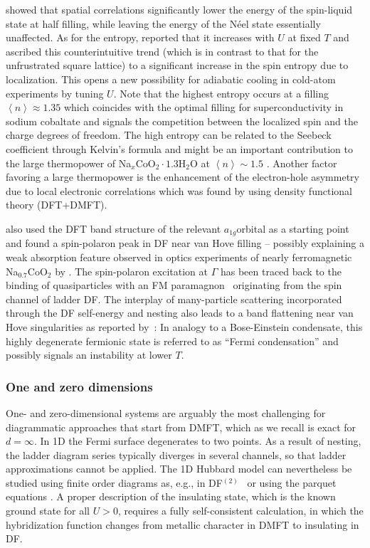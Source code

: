 \documentclass[rmp,aps,reprint,amsmath,amssymb,superscriptaddress,showpacs,nofootinbib]{revtex4-1}
\newcommand{\av}[1]{\ensuremath{\left\langle #1 \right\rangle}}
\begin{document}
 showed that spatial correlations significantly lower the energy of the spin-liquid state at half filling, while leaving the energy of the N\'eel state essentially unaffected. As for the entropy,  reported that  it increases with  $U$  at fixed $T$ and  ascribed this counterintuitive trend  (which is in contrast to that for the unfrustrated square lattice) to a significant increase in the spin entropy due to localization.  This opens a new possibility for adiabatic cooling in cold-atom experiments by tuning $U$. Note that the highest entropy occurs at a filling $\av{n}\approx 1.35$ which coincides with the optimal filling for superconductivity in sodium cobaltate and signals the competition between the localized spin and the charge degrees of freedom. The high entropy can be related to  the Seebeck coefficient through Kelvin's formula and might be an important contribution to the large thermopower of Na$_{x}$CoO$_{2}\cdot1.3$H$_{2}$O at $\av{n}\sim 1.5$ \cite{Terasaki1997}. Another factor favoring a large thermopower is the enhancement of the electron-hole asymmetry due to local electronic correlations which was found by  using density functional theory (DFT+DMFT).

  also used the DFT band structure of the relevant $a_{1g}$orbital as a starting point and found a spin-polaron peak in DF near van Hove filling -- possibly explaining a weak absorption feature observed in optics experiments of nearly ferromagnetic Na$_{0.7}$CoO$_{2}$ by . The spin-polaron excitation at $\Gamma$ has been traced back to the binding of quasiparticles with an FM paramagnon~\cite{Boehnke2012} originating from the spin channel of ladder DF. The interplay of many-particle scattering incorporated through the DF self-energy and nesting also leads to a band flattening near van Hove singularities as reported by~:  In analogy to a Bose-Einstein condensate, this highly degenerate fermionic state is referred to as ``Fermi condensation'' and possibly signals an instability at lower $T$.

\subsubsection{One and zero dimensions}
\label{sec:0dHM}

One- and zero-dimensional systems are arguably the most challenging for diagrammatic approaches that start from DMFT, which as we recall is exact for $d=\infty$. In 1D the Fermi surface degenerates to two points. As a result of nesting, the ladder diagram series typically diverges in several channels, so that ladder approximations cannot be applied. The 1D Hubbard model can nevertheless be studied  using finite order diagrams as, e.g., in  DF$^{(2)}$~\cite{Hafermann2008} or using the parquet equations \cite{Valli2015}. A proper description of the insulating state, which is the known ground state for all $U>0$, requires a fully self-consistent calculation, in which the hybridization function changes from metallic character in DMFT to insulating in DF.
\end{document}
